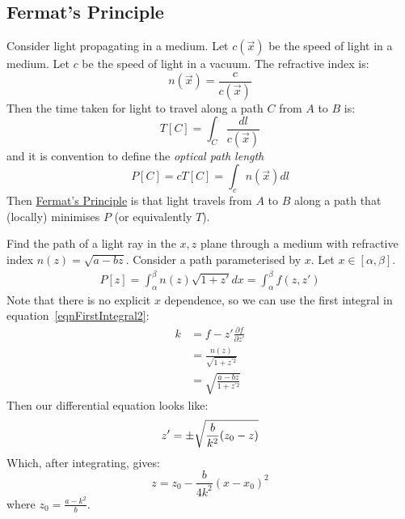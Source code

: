 \documentclass[../Main.tex]{subfiles}
\begin{document}
\subsection{Fermat's Principle}
Consider light propagating in a medium. Let $c(\vec{x})$ be the speed of light in a medium. Let $c$ be the speed of light in a vacuum. The refractive index is:
\begin{equation*}
    n(\vec{x}) = \frac{c}{c(\vec{x})}
\end{equation*}
Then the time taken for light to travel along a path $C$ from $A$ to $B$ is:
\begin{equation*}
    T[C] = \int_C \frac{dl}{c(\vec{x})}
\end{equation*}
and it is convention to define the \textit{optical path length}
\begin{equation*}
    P[C] = cT[C] = \int_c n(\vec{x}) dl
\end{equation*}
Then \underline{Fermat's Principle} is that light travels from $A$ to $B$ along a path that (locally) minimises $P$ (or equivalently $T$).
\begin{example}
    Find the path of a light ray in the $x, z$ plane through a medium with refractive index $n(z) = \sqrt{a - bz}$.
    Consider a path parameterised by $x$. Let $x \in [\alpha, \beta]$.
    \begin{align}
        P[z] = \int_\alpha^\beta n(z) \sqrt{1 + z'} dx = \int_\alpha^\beta f(z, z')
    \end{align}
    Note that there is no explicit $x$ dependence, so we can use the first integral in equation~\ref{eqnFirstIntegral2}:
    \begin{align*}
        k &= f - z'\frac{\partial f}{\partial z'} \\
        &= \frac{n(z)}{\sqrt{1 + z^{\prime 2}}} \\
        &= \sqrt{\frac{a - bz}{1 + z^{\prime 2}}}
    \end{align*}
    Then our differential equation looks like:
    \begin{equation*}
        z' = \pm \sqrt{\frac{b}{k^2}(z_0 - z)} \\
    \end{equation*}
    Which, after integrating, gives:
    \begin{equation*}
        z = z_0 - \frac{b}{4k^2}(x - x_0)^2
    \end{equation*}
    where $z_0 = \frac{a - k^2}{b}$.
\end{example}
\end{document}
